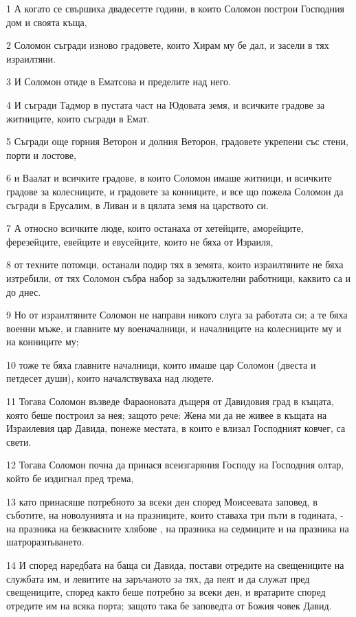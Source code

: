\par 1 А когато се свършиха двадесетте години, в които Соломон построи Господния дом и своята къща,
\par 2 Соломон съгради изново градовете, които Хирам му бе дал, и засели в тях израилтяни.
\par 3 И Соломон отиде в Ематсова и пределите над него.
\par 4 И съгради Тадмор в пустата част на Юдовата земя, и всичките градове за житниците, които съгради в Емат.
\par 5 Съгради още горния Веторон и долния Веторон, градовете укрепени със стени, порти и лостове,
\par 6 и Ваалат и всичките градове, в които Соломон имаше житници, и всичките градове за колесниците, и градовете за конниците, и все що пожела Соломон да съгради в Ерусалим, в Ливан и в цялата земя на царството си.
\par 7 А относно всичките люде, които останаха от хетейците, аморейците, ферезейците, евейците и евусейците, които не бяха от Израиля,
\par 8 от техните потомци, останали подир тях в земята, които израилтяните не бяха изтребили, от тях Соломон събра набор за задължителни работници, каквито са и до днес.
\par 9 Но от израилтяните Соломон не направи никого слуга за работата си; а те бяха военни мъже, и главните му военачалници, и началниците на колесниците му и на конниците му;
\par 10 тоже те бяха главните началници, които имаше цар Соломон (двеста и петдесет души), които началствуваха над людете.
\par 11 Тогава Соломон възведе Фараоновата дъщеря от Давидовия град в къщата, която беше построил за нея; защото рече: Жена ми да не живее в къщата на Израилевия цар Давида, понеже местата, в които е влизал Господният ковчег, са свети.
\par 12 Тогава Соломон почна да принася всеизгаряния Господу на Господния олтар, който бе издигнал пред трема,
\par 13 като принасяше потребното за всеки ден според Моисеевата заповед, в съботите, на новолунията и на празниците, които ставаха три пъти в годината, - на празника на безквасните хлябове , на празника на седмиците и на празника на шатроразпъването.
\par 14 И според наредбата на баща си Давида, постави отредите на свещениците на службата им, и левитите на заръчаното за тях, да пеят и да служат пред свещениците, според както беше потребно за всеки ден, и вратарите според отредите им на всяка порта; защото така бе заповедта от Божия човек Давид.
